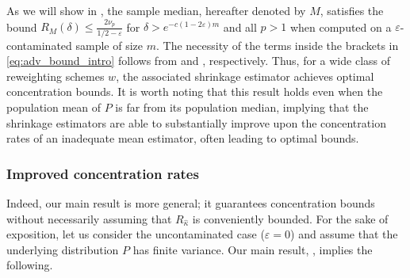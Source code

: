 \documentclass{article}
\theoremstyle{plain}
\theoremstyle{definition}
\begin{document}
 As we will show in , the sample median, hereafter denoted by \( M  \), satisfies the bound \( R_M (\delta )\le \frac{2\nu _p }{1 / 2 - \varepsilon } \) for \( \delta>e^{-c\left( 1-2 \varepsilon  \right) m} \) and all \( p>1 \) when computed on a \(\varepsilon\)-contaminated sample of size \(m\). The necessity of the terms inside the brackets in \eqref{eq:adv_bound_intro} follows from \cite[Theorem 3.1]{devroye2016sub} and \cite[Lemma 5.4]{minsker2019uniform}, respectively. Thus, for a wide class of reweighting schemes \( w \), the associated shrinkage estimator achieves optimal concentration bounds. It is worth noting that this result holds even when the population mean of \( P \) is far from its population median, implying that the shrinkage estimators are able to substantially improve upon the concentration rates of an inadequate mean estimator, often leading to optimal bounds. 

\subsubsection{Improved concentration rates}
Indeed, our main result is more general; it guarantees concentration bounds without necessarily assuming that \( R_{\widehat{\kappa }}\) is conveniently bounded. For the sake of exposition, let us consider the uncontaminated case (\( \varepsilon =0 \)) and assume that the underlying distribution \( P \) has finite variance. 
Our main result, , implies the following.
\end{document}

